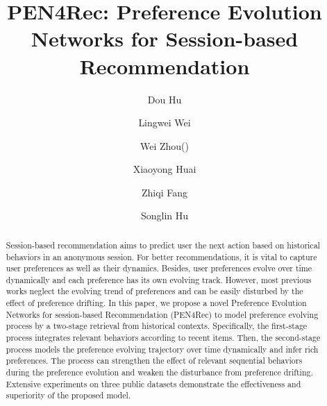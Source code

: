 \documentclass[runningheads]{llncs}
\begin{document}
\title{PEN4Rec: Preference Evolution Networks for Session-based Recommendation}


\author{Dou Hu 
\and Lingwei Wei
\and Wei Zhou(\Letter)
\and Xiaoyong Huai 
\and Zhiqi Fang 
\and Songlin Hu
}



\maketitle              \begin{abstract}
  \let\thefootnote\relax{}

Session-based recommendation aims to predict user the next action based on historical behaviors in an anonymous session. For better recommendations, it is vital to capture user preferences as well as their dynamics. Besides, user preferences evolve over time dynamically and each preference has its own evolving track. However, most previous works neglect the evolving trend of preferences and can be easily disturbed by the effect of preference drifting. In this paper, we propose a novel Preference Evolution Networks for session-based Recommendation (PEN4Rec) to model preference evolving process by a two-stage retrieval from historical contexts. Specifically, the first-stage process integrates relevant behaviors according to recent items. Then, the second-stage process models the preference evolving trajectory over time dynamically and infer rich preferences. The process can strengthen the effect of relevant sequential behaviors during the preference evolution and weaken the disturbance from preference drifting. Extensive experiments on three public datasets demonstrate the effectiveness and superiority of the proposed model.

 
\end{abstract}
\end{document}
